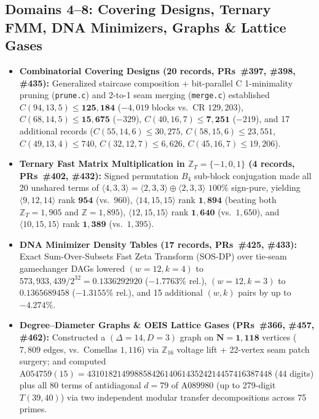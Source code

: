 \documentclass[11pt,a4paper]{article}
\begin{document}
\subsection{Domains 4--8: Covering Designs, Ternary FMM, DNA Minimizers, Graphs \& Lattice Gases}
\begin{itemize}\itemsep=2pt
    \item \textbf{Combinatorial Covering Designs (20 records, PRs~\#397, \#398, \#435):} Generalized staircase composition + bit-parallel C 1-minimality pruning (\texttt{prune.c}) and 2-to-1 seam merging (\texttt{merge.c}) established $C(94,13,5) \le \mathbf{125{,}184}$ ($-4{,}019$ blocks vs.\ CR $129{,}203$), $C(68,14,5) \le \mathbf{15{,}675}$ ($-329$), $C(40,16,7) \le \mathbf{7{,}251}$ ($-219$), and 17 additional records ($C(55,14,6) \le 30{,}275$, $C(58,15,6) \le 23{,}551$, $C(49,13,4) \le 740$, $C(32,12,7) \le 6{,}626$, $C(45,16,7) \le 19{,}206$).
    \item \textbf{Ternary Fast Matrix Multiplication in $\mathbb{Z}_T = \{-1,0,1\}$ (4 records, PRs~\#402, \#432):} Signed permutation $B_4$ sub-block conjugation made all 20 unshared terms of $\langle 4,3,3\rangle = \langle 2,3,3\rangle \oplus \langle 2,3,3\rangle$ $100\%$ sign-pure, yielding $\langle 9,12,14\rangle$ rank $\mathbf{954}$ (vs.\ $960$), $\langle 14,15,15\rangle$ rank $\mathbf{1{,}894}$ (beating both $\mathbb{Z}_T=1{,}905$ and $\mathbb{Z}=1{,}895$), $\langle 12,15,15\rangle$ rank $\mathbf{1{,}640}$ (vs.\ $1{,}650$), and $\langle 10,15,15\rangle$ rank $\mathbf{1{,}389}$ (vs.\ $1{,}395$).
    \item \textbf{DNA Minimizer Density Tables (17 records, PRs~\#425, \#433):} Exact Sum-Over-Subsets Fast Zeta Transform (SOS-DP) over tie-seam gamechanger DAGs lowered $(w=12,k=4)$ to $573{,}933{,}439/2^{32} = \mathbf{0.1336292920}$ ($-1.7763\%$ rel.), $(w=12,k=3)$ to $\mathbf{0.1365689458}$ ($-1.3155\%$ rel.), and 15 additional $(w,k)$ pairs by up to $\mathbf{-4.274\%}$.
    \item \textbf{Degree--Diameter Graphs \& OEIS Lattice Gases (PRs~\#366, \#457, \#462):} Constructed a $(\Delta=14, D=3)$ graph on $\mathbf{N = 1{,}118}$ vertices ($7{,}809$ edges, vs.\ Comellas $1{,}116$) via $\mathbb{Z}_{16}$ voltage lift + 22-vertex seam patch surgery; and computed $\text{A054759}(15) = 4310182149988584261406143524214457416387448$ (44 digits) plus all 80 terms of antidiagonal $d=79$ of $\text{A089980}$ (up to 279-digit $T(39,40)$) via two independent modular transfer decompositions across 75 primes.
\end{itemize}
\end{document}
